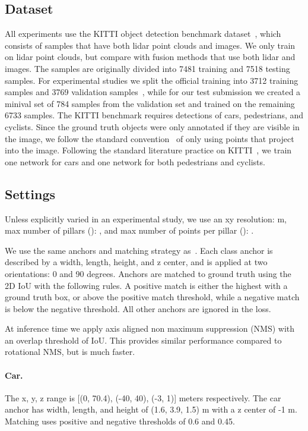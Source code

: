 \documentclass[10pt,twocolumn,letterpaper]{article}
\newcommand{\mypar}[1]{\vspace{-4mm}\paragraph{#1}}
\newcommand{\squeeze}{\vspace{-0.5mm}}
\begin{document}
\subsection{Dataset}
\squeeze
All experiments use the KITTI object detection benchmark dataset~\cite{kitti}, which consists of samples that have both lidar point clouds and images.
We only train on lidar point clouds, but compare with fusion methods that use both lidar and images.
The samples are originally divided into 7481 training and 7518 testing samples.
For experimental studies we split the official training into 3712 training samples and 3769 validation samples~\cite{chen20153d}, while for our test submission we created a minival set of 784 samples from the validation set and trained on the remaining 6733 samples.
The KITTI benchmark requires detections of cars, pedestrians, and cyclists.
Since the ground truth objects were only annotated if they are visible in the image, we follow the standard convention~\cite{mv3d, voxelnet} of only using \lidar points that project into the image.
Following the standard literature practice on KITTI~\cite{avod,voxelnet,second}, we train one network for cars and one network for both pedestrians and cyclists.

\squeeze
\subsection{Settings}
\squeeze

Unless explicitly varied in an experimental study, we use an xy resolution: \xyres m,  max number of pillars (): \maxpillars, and  max number of points per pillar (): \maxpts.

We use the same anchors and matching strategy as~\cite{voxelnet}.
Each class anchor is described by a width, length, height, and z center, and is applied at two orientations: 0 and 90 degrees.
Anchors are matched to ground truth using the 2D IoU with the following rules.
A positive match is either the highest with a ground truth box, or above the positive match threshold, while a negative match is below the negative threshold.
All other anchors are ignored in the loss.

At inference time we apply axis aligned non maximum suppression (NMS) with an overlap threshold of  IoU.
This provides similar performance compared to rotational NMS, but is much faster.

\mypar{Car.}
The x, y, z range is [(0, 70.4), (-40, 40), (-3, 1)] meters respectively.
The car anchor has width, length, and height of (1.6, 3.9, 1.5) m with a z center of -1 m.
Matching uses positive and negative thresholds of 0.6 and 0.45.
\end{document}
